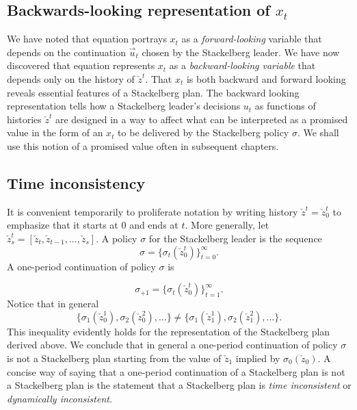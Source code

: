 \subsection{Backwards-looking representation of $x_t$}

We have noted that equation   portrays $x_t$ as a {\it forward-looking\/} variable that depends on the continuation $\vec u_{t}$ chosen
by the Stackelberg leader. We have now discovered that equation  represents $x_t$ as a {\it backward-looking variable} that
depends only on the history of $\check z^t$.  That $x_t$ is both backward and forward  looking reveals essential features of a Stackelberg plan.
The backward looking representation  tells how a Stackelberg leader's decisions $u_t$ as functions of histories $\check z^t$ are designed in a way to affect what can be interpreted as a promised value in the form of an  $x_t$ to be delivered by the Stackelberg policy $\sigma$.
We shall use this notion of a promised value often in subsequent chapters.




\subsection{Time  inconsistency}

It is convenient temporarily to proliferate notation by writing history $\check z^t = \check z^t_0$ to emphasize that it starts at $0$ and ends at $t$.
More generally, let $\check z^t_s = [\check z_t, \check z_{t-1}, \ldots, \check z_s] $. A policy $\sigma$ for the Stackelberg leader is the sequence
$$ \sigma =\{\sigma_t(\check z^t_0)\}_{t=0}^\infty .$$   A one-period  continuation of policy $\sigma$ is

$$\sigma_{+1} = \{\sigma_t(\check z^t_0)\}_{t=1}^\infty .$$
Notice that in general
$$ \{ \sigma_1(\check z_0^1), \sigma_2(\check z_0^2), \ldots \} \neq \{\sigma_1(\check z_1^1), \sigma_2(\check z_1^2), \ldots \} .$$
This inequality evidently holds for the representation  of the Stackelberg plan derived above.
We conclude that in general a one-period continuation of policy $\sigma$ is not a Stackelberg plan starting from the value of
$\check z_1$ implied by  $\sigma_0(\check z_0)$. A concise way of saying that a one-period continuation of a Stackelberg plan is not a Stackelberg plan is
the statement that  a Stackelberg plan is {\it time inconsistent\/} or {\it dynamically
inconsistent\/}.




